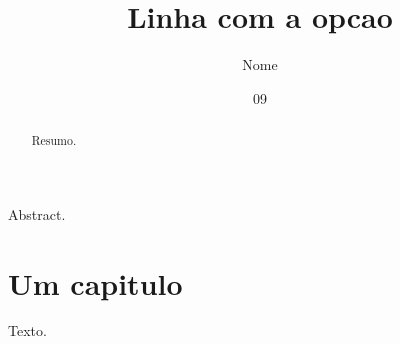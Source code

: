 \documentclass[dsc,linhanafolhaderosto]{ufrj}
\title{Linha com a opcao}
\author{Nome}{Sobrenome}
\date{09}{2026}
\begin{document}
  \maketitle
  \frontmatter
  \begin{abstract}Resumo.\end{abstract}
  \begin{foreignabstract}Abstract.\end{foreignabstract}
  \tableofcontents
  \mainmatter
  \chapter{Um capitulo}
  Texto.
\end{document}
